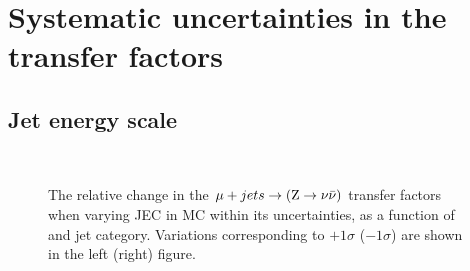 \clearpage
\section{Systematic uncertainties in the transfer factors}
\label{app:systematics}

\subsection{Jet energy scale}

\begin{figure}[!h]
  \centering
   ~~
  \\

  \caption{\label{fig:tfSyst_jec_muToZinv} The relative change in the
  $\mj \rightarrow (\znunu)$ transfer
  factors when varying JEC in MC within its uncertainties, as a function of \scalht and jet category. 
  Variations corresponding to $+1\sigma$ ($-1\sigma$) are shown in the left (right) figure. 
  }
\end{figure}

